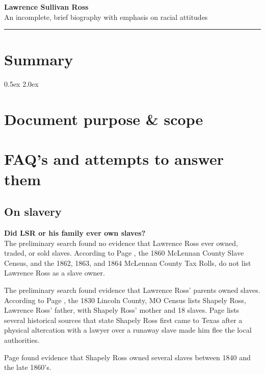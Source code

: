 \documentclass[12pt]{article}
\begin{document}
\Large{\textbf{Lawrence Sullivan Ross \\}}
\large{An incomplete, brief biography with emphasis on racial attitudes \\}
\rule{\textwidth}{1pt}

\section{Summary}

\parskip 0.5ex
\newpage
\tableofcontents
\parskip 2.0ex

\newpage
\section{Document purpose \& scope}

\newpage
\section{FAQ's and attempts to answer them}

\subsection{On slavery}
\textbf{Did LSR or his family ever own slaves? \\ }
The preliminary search found no evidence that Lawrence Ross ever owned, traded, or sold slaves. According to Page \cite[pg.49]{page}, the 1860 McLennan County Slave Census, and the 1862, 1863, and 1864 McLennan County Tax Rolls, do not list Lawrence Ross as a slave owner.

The preliminary search found evidence that Lawrence Ross' parents owned slaves. According to Page \cite[pg.49]{page}, the 1830 Lincoln County, MO Census lists Shapely Ross, Lawrence Ross' father, with Shapely Ross' mother and 18 slaves. Page \cite[pg.50--51]{page} lists several historical sources that state Shapely Ross first came to Texas after a physical altercation with a lawyer over a runaway slave made him flee the local authorities. 

Page \cite[pg.51--55]{page} found evidence that Shapely Ross owned several slaves between 1840 and the late 1860's. 
\end{document}
